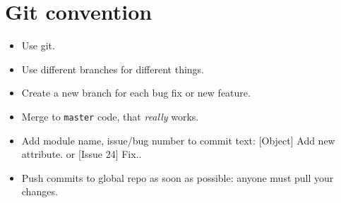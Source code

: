 \documentclass[12pt]{article}
\newcommand{\code}[1]{\colorbox{verylightgray}{\lstinline!#1!}}
\newcommand{\highlightlesscode}[1]{\colorbox{verylightgray}{#1}}
\begin{document}
	\section{Git convention}
		\begin{itemize}
			\item Use git.
			\item Use different branches for different things.
			\item Create a new branch for each bug fix or new feature.
			\item Merge to \code{master} code, that \textit{really} works.
			\item Add module name, issue/bug number to commit text: \highlightlesscode{[Object] Add new attribute.} or \highlightlesscode{[Issue 24] Fix.}.
			\item Push commits to global repo as soon as possible: anyone must pull your changes.
		\end{itemize}
\end{document}
